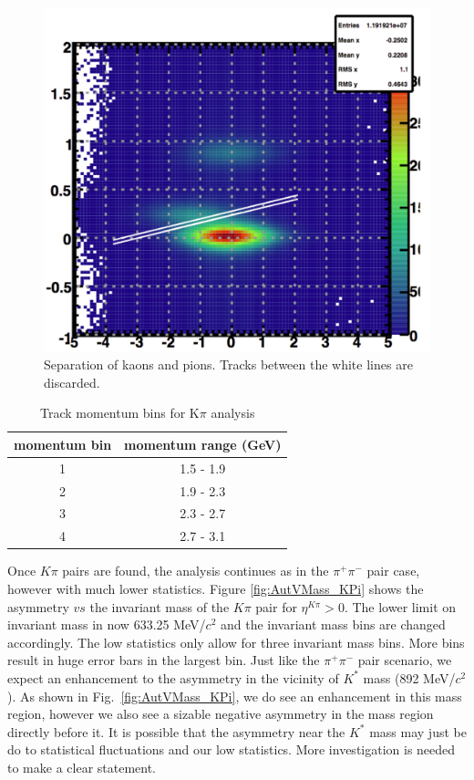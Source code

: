\documentclass[letterpaper, abstract = on,listof=totoc, bibliography=totoc]{scrreprt}
\newcommand{\pip}{\pi^+}
\newcommand{\pim}{\pi^-}
\newcommand{\pair}{$\pip\pim$ }
\newcommand{\etakp}{\eta^{K\pi}}
\begin{document}
\begin{figure}
\begin{center}
\includegraphics[width = 1\textwidth]{tofnsigbiglines}
\caption[Separation of kaons and pions]{Separation of kaons and pions. Tracks between the white lines are discarded.}
\label{fig:tofnsiglines}
\end{center}
\end{figure}
\begin{table}[h!]
\begin{center}
\caption{Track momentum bins for K$\pi$ analysis}
\begin{tabular}{|c|c|} \hline
momentum bin & momentum range (GeV) \\ 
\hline 
1 & 1.5  - 1.9 \\
2 & 1.9 - 2.3 \\
3 & 2.3 - 2.7 \\
4 & 2.7 - 3.1 \\
\hline
\end{tabular}
\label{tab:pBinsKpi}
\end{center}
\end{table}

Once $K\pi$ pairs are found, the analysis continues as in the \pair pair case, however with much lower statistics. Figure \ref{fig:AutVMass_KPi} shows the asymmetry $vs$ the invariant mass of the $K\pi$ pair for $\etakp > 0$. The lower limit on invariant mass in now 633.25 MeV/$c^2$ and the invariant mass bins are changed accordingly. The low statistics only allow for three invariant mass bins. More bins result in huge error bars in the largest bin. Just like the \pair pair scenario, we expect an enhancement to the asymmetry in the vicinity of $K^*$ mass (892 MeV/$c^2$). As shown in Fig.~\ref{fig:AutVMass_KPi}, we do see an enhancement in this mass region, however we also see a sizable negative asymmetry in the mass region directly before it. It is possible that the asymmetry near the $K^*$ mass may just be do to statistical fluctuations and our low statistics. More investigation is needed to make a clear statement. 
\end{document}
